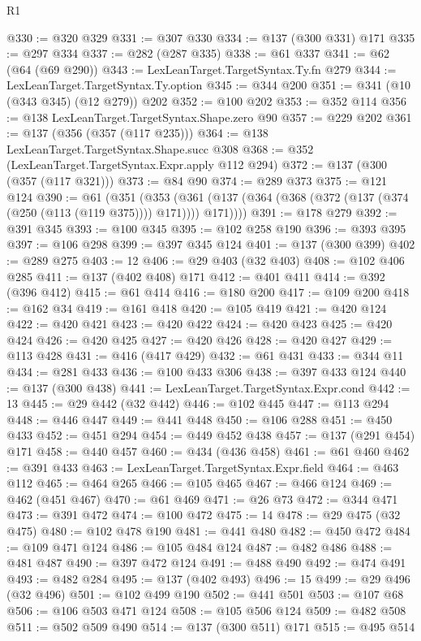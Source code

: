 \begin{lexlean}{R1}
\begin{coremodule}
@330 := @320 @329
@331 := @307 @330
@334 := @137 (@300 @331) @171
@335 := @297 @334
@337 := @282 (@287 @335)
@338 := @61 @337
@341 := @62 (@64 (@69 @290))
@343 := LexLeanTarget.TargetSyntax.Ty.fn @279
@344 := LexLeanTarget.TargetSyntax.Ty.option
@345 := @344 @200
@351 := @341 (@10 (@343 @345) (@12 @279)) @202
@352 := @100 @202
@353 := @352 @114
@356 := @138 LexLeanTarget.TargetSyntax.Shape.zero @90
@357 := @229 @202
@361 := @137 (@356 (@357 (@117 @235)))
@364 := @138 LexLeanTarget.TargetSyntax.Shape.succ @308
@368 := @352 (LexLeanTarget.TargetSyntax.Expr.apply @112 @294)
@372 := @137 (@300 (@357 (@117 @321)))
@373 := @84 @90
@374 := @289 @373
@375 := @121 @124
@390 := @61
    (@351
      (@353 (@361 (@137 (@364 (@368 (@372 (@137 (@374 (@250 (@113 (@119 @375)))) @171)))) @171))))
@391 := @178 @279
@392 := @391 @345
@393 := @100 @345
@395 := @102 @258 @190
@396 := @393 @395
@397 := @106 @298
@399 := @397 @345 @124
@401 := @137 (@300 @399)
@402 := @289 @275
@403 := 12
@406 := @29 @403 (@32 @403)
@408 := @102 @406 @285
@411 := @137 (@402 @408) @171
@412 := @401 @411
@414 := @392 (@396 @412)
@415 := @61 @414
@416 := @180 @200
@417 := @109 @200
@418 := @162 @34
@419 := @161 @418
@420 := @105 @419
@421 := @420 @124
@422 := @420 @421
@423 := @420 @422
@424 := @420 @423
@425 := @420 @424
@426 := @420 @425
@427 := @420 @426
@428 := @420 @427
@429 := @113 @428
@431 := @416 (@417 @429)
@432 := @61 @431
@433 := @344 @11
@434 := @281 @433
@436 := @100 @433 @306
@438 := @397 @433 @124
@440 := @137 (@300 @438)
@441 := LexLeanTarget.TargetSyntax.Expr.cond
@442 := 13
@445 := @29 @442 (@32 @442)
@446 := @102 @445
@447 := @113 @294
@448 := @446 @447
@449 := @441 @448
@450 := @106 @288
@451 := @450 @433
@452 := @451 @294
@454 := @449 @452 @438
@457 := @137 (@291 @454) @171
@458 := @440 @457
@460 := @434 (@436 @458)
@461 := @61 @460
@462 := @391 @433
@463 := LexLeanTarget.TargetSyntax.Expr.field
@464 := @463 @112
@465 := @464 @265
@466 := @105 @465
@467 := @466 @124
@469 := @462 (@451 @467)
@470 := @61 @469
@471 := @26 @73
@472 := @344 @471
@473 := @391 @472
@474 := @100 @472
@475 := 14
@478 := @29 @475 (@32 @475)
@480 := @102 @478 @190
@481 := @441 @480
@482 := @450 @472
@484 := @109 @471 @124
@486 := @105 @484 @124
@487 := @482 @486
@488 := @481 @487
@490 := @397 @472 @124
@491 := @488 @490
@492 := @474 @491
@493 := @482 @284
@495 := @137 (@402 @493)
@496 := 15
@499 := @29 @496 (@32 @496)
@501 := @102 @499 @190
@502 := @441 @501
@503 := @107 @68
@506 := @106 @503 @471 @124
@508 := @105 @506 @124
@509 := @482 @508
@511 := @502 @509 @490
@514 := @137 (@300 @511) @171
@515 := @495 @514

\end{coremodule}
\end{lexlean}
